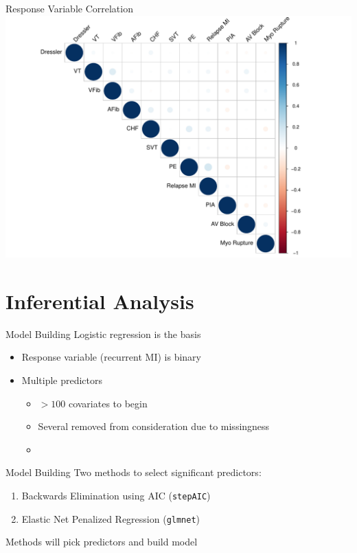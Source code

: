 \documentclass[
  ignorenonframetext,
]{beamer}
\begin{document}
\begin{frame}{Response Variable Correlation}
\protect\hypertarget{response-variable-correlation}{}
\includegraphics{sibs-hackathon-presentation_files/figure-beamer/ResVarCorrPlot-1.pdf}
\end{frame}

\hypertarget{inferential-analysis}{%
\section{Inferential Analysis}\label{inferential-analysis}}

\begin{frame}{Model Building}
\protect\hypertarget{model-building}{}
Logistic regression is the basis

\begin{itemize}
\item
  Response variable (recurrent MI) is binary
\item
  Multiple predictors

  \begin{itemize}
  \item
    \(>100\) covariates to begin
  \item
    Several removed from consideration due to missingness
  \item
  \end{itemize}
\end{itemize}
\end{frame}

\begin{frame}[fragile]{Model Building}
\protect\hypertarget{model-building-1}{}
Two methods to select significant predictors:

\begin{enumerate}
\item
  Backwards Elimination using AIC (\texttt{stepAIC})
\item
  Elastic Net Penalized Regression (\texttt{glmnet})
\end{enumerate}

Methods will pick predictors and build model
\end{frame}
\end{document}
